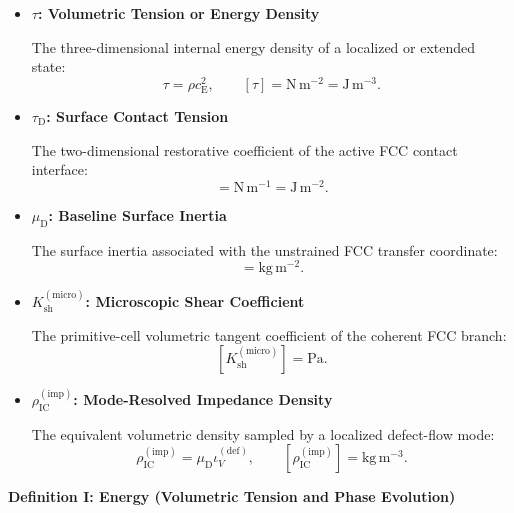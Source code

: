 \begin{itemize}
    \item \textbf{$\tau$: Volumetric Tension or Energy Density}
    
    The three-dimensional internal energy density of a localized or extended state:
    \begin{equation}
        \tau = \rho c_{\mathrm{E}}^2, \qquad [\tau] = \mathrm{N\,m^{-2}} = \mathrm{J\,m^{-3}}.
    \end{equation}
    
    \item \textbf{$\tau_{\mathrm{D}}$: Surface Contact Tension}
    
    The two-dimensional restorative coefficient of the active FCC contact interface:
    \begin{equation}
        [\tau_{\mathrm{D}}] = \mathrm{N\,m^{-1}} = \mathrm{J\,m^{-2}}.
    \end{equation}
    
    \item \textbf{$\mu_{\mathrm{D}}$: Baseline Surface Inertia}
    
    The surface inertia associated with the unstrained FCC transfer coordinate:
    \begin{equation}
        [\mu_{\mathrm{D}}] = \mathrm{kg\,m^{-2}}.
    \end{equation}
    
    \item \textbf{$K_{\mathrm{sh}}^{(\mathrm{micro})}$: Microscopic Shear Coefficient}
    
    The primitive-cell volumetric tangent coefficient of the coherent FCC branch:
    \begin{equation}
        \left[ K_{\mathrm{sh}}^{(\mathrm{micro})} \right] = \mathrm{Pa}.
    \end{equation}
    
    \item \textbf{$\rho_{\mathrm{IC}}^{(\mathrm{imp})}$: Mode-Resolved Impedance Density}
    
    The equivalent volumetric density sampled by a localized defect-flow mode:
    \begin{equation}
        \rho_{\mathrm{IC}}^{(\mathrm{imp})} = \mu_{\mathrm{D}} \iota_V^{(\mathrm{def})}, \qquad \left[ \rho_{\mathrm{IC}}^{(\mathrm{imp})} \right] = \mathrm{kg\,m^{-3}}.
    \end{equation}
\end{itemize}

\vspace{0.5em}
\label{def:definition_one}
\noindent\textbf{Definition I: Energy (Volumetric Tension and Phase Evolution)}

